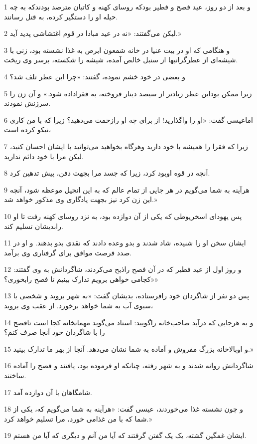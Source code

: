 \par 1 و بعد از دو روز، عید فصح و فطیر بودکه روسای کهنه و کاتبان مترصد بودندکه به چه حیله او را دستگیر کرده، به قتل رسانند.
\par 2 لیکن می‌گفتند: «نه در عید مبادا در قوم اغتشاشی پدید آید.»
\par 3 و هنگامی که او در بیت عنیا در خانه شمعون ابرص به غذا نشسته بود، زنی با شیشه‌ای از عطرگرانبها از سنبل خالص آمده، شیشه را شکسته، برسر وی ریخت.
\par 4 و بعضی در خود خشم نموده، گفتند: «چرا این عطر تلف شد؟
\par 5 زیرا ممکن بوداین عطر زیادتر از سیصد دینار فروخته، به فقراداده شود.» و آن زن را سرزنش نمودند.
\par 6 اماعیسی گفت: «او را واگذارید! از برای چه او رازحمت می‌دهید؟ زیرا که با من کاری نیکو کرده است،
\par 7 زیرا که فقرا را همیشه با خود دارید وهرگاه بخواهید می‌توانید با ایشان احسان کنید، لیکن مرا با خود دائم ندارید.
\par 8 آنچه در قوه اوبود کرد، زیرا که جسد مرا بجهت دفن، پیش تدهین کرد.
\par 9 هرآینه به شما می‌گویم در هر جایی از تمام عالم که به این انجیل موعظه شود، آنچه این زن کرد نیز بجهت یادگاری وی مذکور خواهد شد.»
\par 10 پس یهودای اسخریوطی که یکی از آن دوازده بود، به نزد روسای کهنه رفت تا او رابدیشان تسلیم کند.
\par 11 ایشان سخن او را شنیده، شاد شدند و بدو وعده دادند که نقدی بدو بدهند. و او در صدد فرصت موافق برای گرفتاری وی برآمد.
\par 12 و روز اول از عید فطیر که در آن فصح راذبح می‌کردند، شاگردانش به وی گفتند: «کجامی خواهی برویم تدارک بینیم تا فصح رابخوری؟»
\par 13 پس دو نفر از شاگردان خود رافرستاده، بدیشان گفت: «به شهر بروید و شخصی با سبوی آب به شما خواهد برخورد. از عقب وی بروید،
\par 14 و به هرجایی که درآید صاحب‌خانه راگویید: استاد می‌گوید مهمانخانه کجا است تافصح را با شاگردان خود آنجا صرف کنم؟
\par 15 و اوبالاخانه بزرگ مفروش و آماده به شما نشان می‌دهد. آنجا از بهر ما تدارک بینید.»
\par 16 شاگردانش روانه شدند و به شهر رفته، چنانکه او فرموده بود، یافتند و فصح را آماده ساختند.
\par 17 شامگاهان با آن دوازده آمد.
\par 18 و چون نشسته غذا می‌خوردند، عیسی گفت: «هرآینه به شما می‌گویم که، یکی از شما که با من غذامی خورد، مرا تسلیم خواهد کرد.»
\par 19 ایشان غمگین گشته، یک یک گفتن گرفتند که آیا من آنم و دیگری که آیا من هستم.
